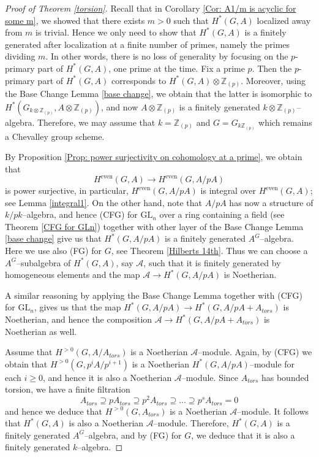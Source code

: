 \documentclass{article}
\theoremstyle{plain}
\theoremstyle{definition}
\DeclareMathOperator{\even}{even}
\newcommand{\GL}{\mathrm{GL}}
\begin{document}
\begin{proof}[Proof of Theorem \ref{torsion}]
    Recall that in  Corollary \ref{Cor: A1/m is acyclic for some m}, we showed that there exists $m>0$ such that $H^\ast(G,A)$ localized away from $m$ is trivial. Hence we only need to show that $H^\ast(G,A)$ is a finitely generated after localization at a finite number of primes, namely the primes dividing $m$. In other words, there is no loss of generality by focusing on the $p$-primary part of $H^\ast(G,A)$, one prime at the time. Fix a prime $p$. Then the $p$-primary part of $H^\ast(G,A)$ corresponds to $H^\ast(G,A)\otimes \mathbb{Z}_{(p)}$. Moreover, using the Base Change Lemma  \ref{base change}, we obtain that the latter is isomorphic to $H^\ast(G_{k\otimes \mathbb{Z}_{(p)}},A\otimes \mathbb{Z}_{(p)})$, and now $A\otimes \mathbb{Z}_{(p)}$ is a finitely generated $k\otimes \mathbb{Z}_{(p)}$--algebra. Therefore, we may assume that $k=\mathbb{Z}_{(p)}$ and $G=G_{k\mathbb{Z}_{(p)}}$ which remains a Chevalley group scheme.  

    By Proposition \ref{Prop: power surjectivity on cohomology at a prime}, we obtain that 
    \[
    H^{\even}(G, A) \to H^{\even}(G, A/pA)
    \]
    is power surjective, in particular, $H^{\even}(G, A/pA)$ is integral over $H^{\even}(G, A)$; see Lemma \ref{integral1}. On the other hand, note that $A/pA$ has now a structure of $k/pk$--algebra, and hence (CFG) for $\GL_n$ over a ring containing a field (see Theorem \ref{CFG for GLn}) together with other layer of the Base Change Lemma \ref{base change} give us that $H^\ast(G,A/pA)$ is a finitely generated $A^G$--algebra. Here we use also (FG) for $G$, see Theorem \ref{Hilberts 14th}. Thus we can choose a $A^G$--subalgebra of $H^\ast(G,A)$, say $\mathscr{A}$, such that it is finitely generated by homogeneous elements and the map $\mathscr{A}\to H^\ast(G,A/pA)$ is Noetherian. 

    A similar reasoning by applying the Base Change Lemma together with (CFG) for $\GL_n$, gives us that the map $H^\ast(G,A/pA)\to H^\ast(G,A/pA+A_{tors})$ is Noetherian, and hence the composition $\mathscr{A}\to H^\ast(G,A/pA+A_{tors})$ is Noetherian as well. 

    Assume that $H^{>0}(G,A/A_{tors})$ is a Noetherian $\mathscr{A}$--module. 
    Again, by (CFG) we obtain that $H^{>0}(G,p^iA/p^{i+1})$ is a Noetherian $H^\ast(G,A/pA)$--module for each $i\geq 0$, and hence it is also a Noetherian $\mathscr{A}$--module.  Since $A_{tors}$ has bounded torsion, we have a finite filtration 
    \[
    A_{tors}\supseteq pA_{tors}\supseteq p^2A_{tors}\supseteq\ldots \supseteq p^sA_{tors}=0
    \]
     and hence we deduce that $H^{>0}(G,A_{tors})$ is a Noetherian $\mathscr{A}$--module. It follows that $H^\ast(G,A)$ is also a Noetherian $\mathscr{A}$--module. Therefore, $H^\ast(G,A)$ is a finitely generated $A^G$--algebra, and by (FG) for $G$, we deduce that it is also a finitely generated $k$--algebra. 


\end{proof}
\end{document}
